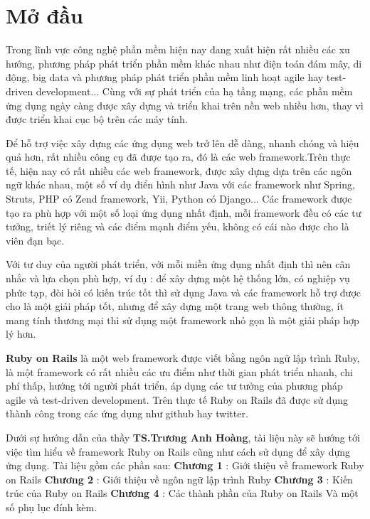 \chapter*{Mở đầu}

Trong lĩnh vực công nghệ phần mềm hiện nay đang xuất hiện rất nhiều các xu hướng,
phương pháp phát triển phần mềm khác nhau như điện toán đám mây, di động, big data 
và phương pháp phát triển phần mềm linh hoạt agile hay test-driven development...
Cùng với sự phát triển của hạ tầng mạng, các phần mềm ứng dụng ngày càng được xây dựng
và triển khai trên nền web nhiều hơn, thay vì được triển khai cục bộ trên các máy tính.

Để hỗ trợ việc xây dựng các ứng dụng web trở lên dễ dàng, nhanh chóng và hiệu quả hơn, rất nhiều
công cụ đã được tạo ra, đó là các web framework.Trên thực tế, hiện nay có rất nhiều các web framework, được xây dựng dựa trên các ngôn ngữ khác nhau, một số ví dụ điển hình như Java với các framework như Spring, Struts, PHP có Zend framework, Yii, Python có Django... Các framework được tạo ra phù hợp với một số loại ứng dụng nhất định, mỗi framework đều có các tư tưởng, triết lý riêng và các điểm mạnh điểm yếu, không có cái nào được cho là viên đạn bạc. 

Với tư duy của người phát triển, với mỗi miền ứng dụng nhất định thì nên cân nhắc và lựa chọn phù hợp, ví dụ : để xây dựng một hệ thống lớn, có nghiệp vụ phức tạp, đòi hỏi có kiến trúc tốt thì sử dụng Java và các framework hỗ trợ được cho là một giải pháp tốt, nhưng để xây dựng một trang web thông thường, ít mang tính thương mại thì sử dụng một framework nhỏ gọn là một giải pháp hợp lý hơn.

{\bf Ruby on Rails} là một web framework được viết bằng ngôn ngữ lập trình Ruby, là một framework có rất nhiều các ưu điểm như thời gian phát triển nhanh, chi phí thấp, hướng tới người phát triển, áp dụng các tư tưởng của phương pháp agile và test-driven development. Trên thực tế Ruby on Rails đã được sử dụng thành công trong các ứng dụng như github hay twitter. 

Dưới sự hướng dẫn của thầy {\bf TS.Trương Anh Hoàng}, tài liệu này sẽ hướng tới việc tìm hiểu về framework Ruby on Rails cũng như cách sử dụng để xây dựng ứng dụng.\newline
Tài liệu gồm các phần sau:\newline
{\bf Chương 1} : Giới thiệu về framework Ruby on Rails\newline
{\bf Chương 2} : Giới thiệu về ngôn ngữ lập trình Ruby\newline
{\bf Chương 3} : Kiến trúc của Ruby on Rails\newline
{\bf Chương 4} : Các thành phần của Ruby on Rails\newline
Và một số phụ lục đính kèm.

